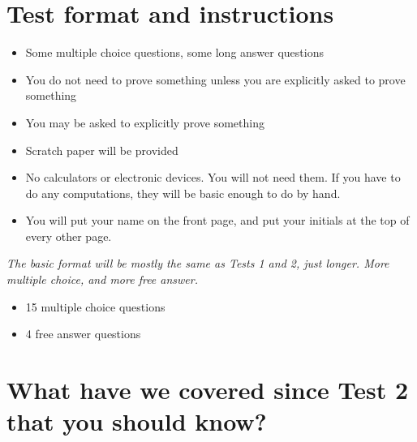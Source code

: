 \documentclass[11  pt]{exam}
\begin{document}
	
	
	\begin{center}
	\end{center}
		

	\section{Test format and instructions}
	
	\begin{itemize}
		\item Some multiple choice questions, some long answer questions
		\item You do not need to prove something unless you are explicitly asked to prove something
		\item You may be asked to explicitly prove something 
		\item Scratch paper will be provided
		\item No calculators or electronic devices. You will not need them. If you have to do any computations, they will be basic enough to do by hand. 
		\item You will put your name on the front page, and put your initials at the top of every other page.
	\end{itemize}
	

	\emph{The basic format will be mostly the same as Tests 1 and 2, just longer. More multiple choice, and more free answer. }
	
	\begin{itemize}
		\item 15 multiple choice questions
		\item 4 free answer questions
	\end{itemize}

	\newpage
	

\section{What have we covered since Test 2 that you should know?}
\end{document}
